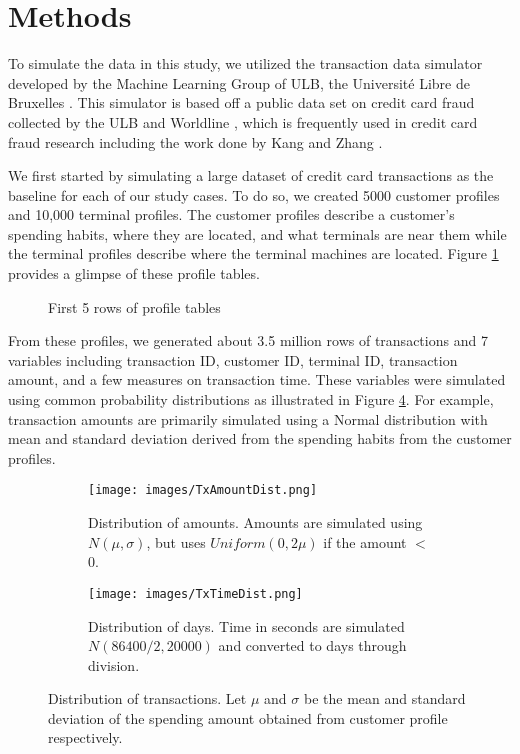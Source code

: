 \documentclass[a4paper, 12pt]{article}
\begin{document}
\section{Methods}

To simulate the data in this study, we utilized the transaction data simulator developed by the Machine Learning Group of ULB, the Université Libre de Bruxelles \cite{fraudDetectionHandbook}. This simulator is based off a public data set on credit card fraud collected by the ULB and Worldline \cite{creditData}, which is frequently used in credit card fraud research including the work done by Kang and Zhang \cite{kcvSmoteStudy, litReviewItoo}.

We first started by simulating a large dataset of credit card transactions as the baseline for each of our study cases. To do so, we created 5000 customer profiles and 10,000 terminal profiles. The customer profiles describe a customer's spending habits, where they are located, and what terminals are near them while the terminal profiles describe where the terminal machines are located. Figure \ref{fig:CustTermHead} provides a glimpse of these profile tables.

\begin{figure}%
    \centering
    \qquad
    \caption{First 5 rows of profile tables}%
    \label{fig:CustTermHead}%
\end{figure}

From these profiles, we generated about 3.5 million rows of transactions and 7 variables including transaction ID, customer ID, terminal ID, transaction amount, and a few measures on transaction time. These variables were simulated using common probability distributions as illustrated in Figure \ref{fig:TxDist}. For example, transaction amounts are primarily simulated using a Normal distribution with mean and standard deviation derived from the spending habits from the customer profiles. 

\begin{figure}[H]
    \centering
    \begin{subfigure}[b]{0.45\textwidth}
        \centering
        \texttt{[image: images/TxAmountDist.png]}
        \caption{Distribution of amounts. Amounts are simulated using $N(\mu,\sigma)$, but uses $Uniform(0, 2\mu)$ if the amount $<$ 0.}
        \label{fig:subfig-a}
    \end{subfigure}
    \begin{subfigure}[b]{0.45\textwidth}
        \centering
        \texttt{[image: images/TxTimeDist.png]}
        \caption{Distribution of days. Time in seconds are simulated $N(86400/2, 20000)$ and converted to days through division.}
        \label{fig:subfig-b}
    \end{subfigure}
    \caption{Distribution of transactions. Let $\mu$ and $\sigma$ be the mean and standard deviation of the spending amount obtained from customer profile respectively.}
    \label{fig:TxDist}
\end{figure}
\end{document}
